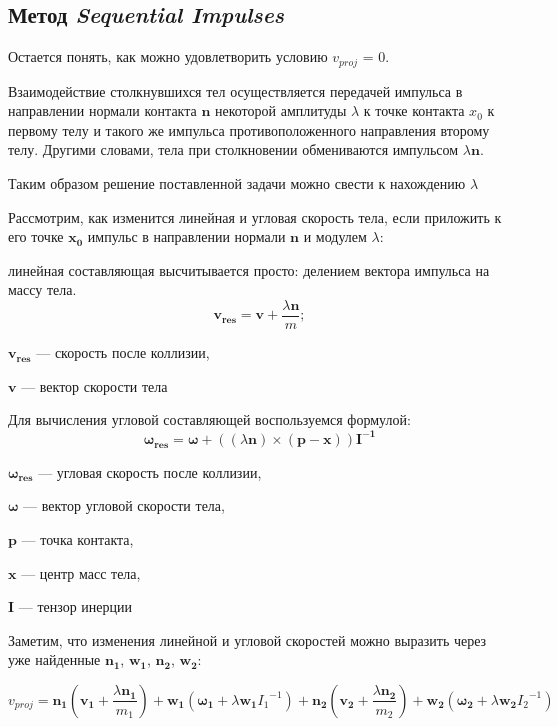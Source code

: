 \subsection{Метод \textit{Sequential Impulses}}
Остается понять, как можно удовлетворить условию $v_{proj}$ = 0.

Взаимодействие столкнувшихся тел осуществляется передачей импульса в направлении нормали контакта $\mathbf{n}$
некоторой амплитуды $\lambda$ к точке контакта $x_0$ к первому телу и такого же импульса противоположенного направления второму телу.
Другими словами, тела при столкновении обмениваются импульсом  $\lambda \mathbf{n}$.

Таким образом решение поставленной задачи можно свести к нахождению $\lambda$

Рассмотрим, как изменится линейная и угловая скорость тела, если приложить к его точке $\mathbf{x_0}$ импульс в направлении нормали $\mathbf{n}$ и 
модулем $\lambda$: 

линейная составляющая высчитывается просто: делением вектора импульса на массу тела.
\begin{equation}
   \mathbf{v_{res}} = \mathbf{v} + \frac{\lambda \mathbf{n}}{m};
\end{equation}
\begin{eqrem}
$\mathbf{v_{res}}$ --- скорость после коллизии,

$\mathbf{v}$ --- вектор скорости тела
\end{eqrem}

Для вычисления угловой составляющей воспользуемся формулой:
\begin{equation}
\mathbf{\omega_{res}} = \mathbf{\omega} + ((\lambda \mathbf{n}) \times (\mathbf{p} - \mathbf{x})) \mathbf{I ^{-1}}
\end{equation}

\begin{eqrem}
$\mathbf{\omega_{res}}$ --- угловая скорость после коллизии,

$\mathbf{\omega}$ --- вектор угловой скорости тела,

$\mathbf{p}$ --- точка контакта,

$\mathbf{x}$ --- центр масс тела,

$\mathbf{I}$ --- тензор инерции
\end{eqrem}

Заметим, что изменения линейной и угловой скоростей можно выразить через уже найденные $\mathbf{n_1}$, $\mathbf{w_1}$,
$\mathbf{n_2}$, $\mathbf{w_2}$:

\begin{equation} 
v_{proj} =
      \mathbf{n_1} (\mathbf{v_1} + \frac{\lambda \mathbf{n_1}}{m_1} ) 
    + \mathbf{w_1} (\mathbf{\omega_{1}} + \lambda \mathbf{w_1}{I_1}^{-1})
    + \mathbf{n_2} (\mathbf{v_2} + \frac{\lambda \mathbf{n_2}}{m_2} ) 
    + \mathbf{w_2} (\mathbf{\omega_{2}} + \lambda \mathbf{w_2}{I_2}^{-1})
\end{equation}

